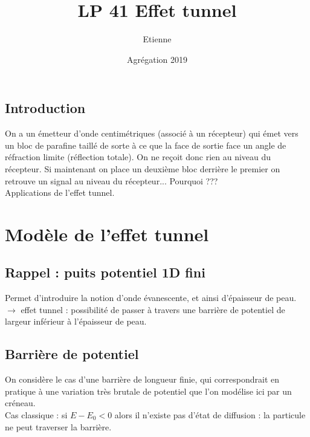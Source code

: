 \documentclass[12pt,prb,aps,epsf]{article}
\begin{document}
	
	\title{LP 41 Effet tunnel}
		\author{Etienne}
		\date{Agrégation 2019}
		
	\maketitle
	
	\tableofcontents
	
	\pagebreak
	
\subsection{Introduction}
On a un émetteur d'onde centimétriques (associé à un récepteur) qui émet vers un bloc de parafine taillé de sorte à ce que la face de sortie face un angle de réfraction limite (réflection totale). On ne reçoit donc rien au niveau du récepteur. Si maintenant on place un deuxième bloc derrière le premier on retrouve un signal au niveau du récepteur... Pourquoi ???\\

Applications de l'effet tunnel.
	
\section{Modèle de l'effet tunnel}	


\subsection{Rappel : puits potentiel 1D fini}
Permet d'introduire la notion d'onde évanescente, et ainsi d'épaisseur de peau. $\rightarrow $ effet tunnel : possibilité de passer à travers une barrière de potentiel de largeur inférieur à l'épaisseur de peau.

\subsection{Barrière de potentiel}
On considère le cas d'une barrière de longueur finie, qui correspondrait en pratique à une variation très brutale de potentiel que l'on modélise ici par un créneau.\\

Cas classique : si $E-E_0 < 0$ alors il n'existe pas d'état de diffusion : la particule ne peut traverser la barrière.
\end{document}
